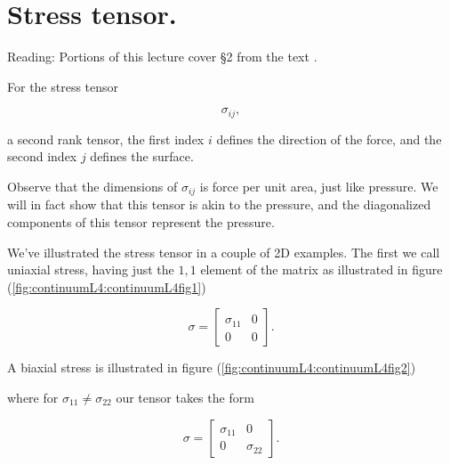 \label{chap:continuumL4}

\section{Stress tensor.}

Reading: Portions of this lecture cover \S 2 from the text \cite{landau1960theory}.

For the stress tensor

\begin{equation}\label{eqn:continuumL4:10}
\sigma_{ij},
\end{equation}

a second rank tensor, the first index $i$ defines the direction of the force, and the second index $j$ defines the surface.

Observe that the dimensions of $\sigma_{ij}$ is force per unit area, just like pressure.  We will in fact show that this tensor is akin to the pressure, and the diagonalized components of this tensor represent the pressure.

We've illustrated the stress tensor in a couple of 2D examples.  The first we call uniaxial stress, having just the $1,1$ element of the matrix as illustrated in figure (\ref{fig:continuumL4:continuumL4fig1})


\begin{equation}\label{eqn:continuumL4:30}
\sigma = 
\begin{bmatrix}
\sigma_{11} & 0 \\
0 & 0
\end{bmatrix}.
\end{equation}

A biaxial stress is illustrated in figure (\ref{fig:continuumL4:continuumL4fig2})

where for $\sigma_{11} \ne \sigma_{22}$ our tensor takes the form

\begin{equation}\label{eqn:continuumL4:50}
\sigma = 
\begin{bmatrix}
\sigma_{11} & 0 \\
0 & \sigma_{22}
\end{bmatrix}.
\end{equation}

